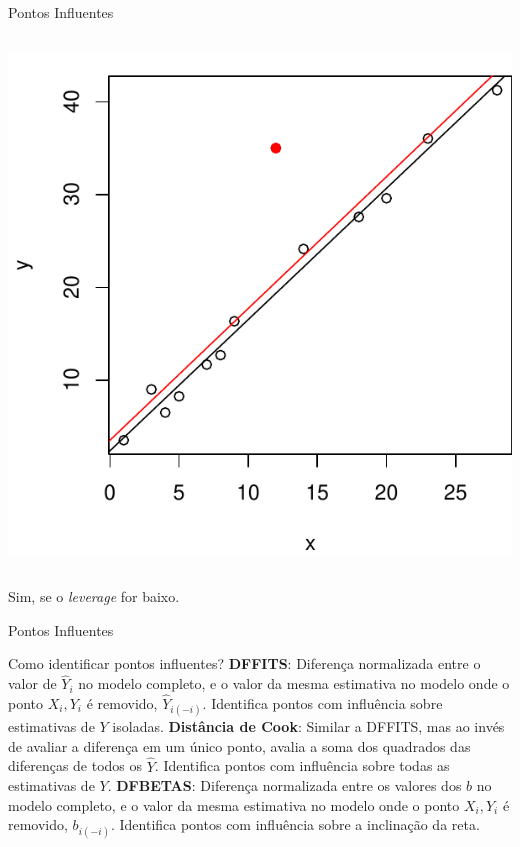 \documentclass{beamer}\usepackage[]{graphicx}\usepackage[]{color}
\newenvironment{knitrout}{}{} %
\renewenvironment{knitrout}{\setlength{\topsep}{0mm}}{}
\begin{document}
\begin{frame}{Pontos Influentes}
\begin{columns}[c]
\begin{knitrout}
\end{knitrout}
\pause
{}
\begin{knitrout}
\color{fgcolor}
\includegraphics[width=1\linewidth]{figure/d12-1} 

\end{knitrout}
\pause
\end{columns}
\vfill
Sim, se o \emph{leverage} for baixo.

\end{frame}

\begin{frame}{Pontos Influentes}
\small

Como identificar pontos influentes? \pause
\vfill
\textbf{DFFITS}: Diferença normalizada entre o valor de $\hat Y_i$ no modelo completo, e o valor da mesma estimativa no modelo onde o ponto $X_i,Y_i$ é removido, $\hat Y_{i(-i)}$. Identifica pontos com influência sobre estimativas de $Y$ isoladas. \pause
\vfill
\textbf{Distância de Cook}: Similar a DFFITS, mas ao invés de avaliar a diferença em um único ponto, avalia a soma dos quadrados das diferenças de todos os $\hat Y$. Identifica pontos com influência sobre todas as estimativas de $Y$. \pause
\vfill
\textbf{DFBETAS}: Diferença normalizada entre os valores dos $b$ no modelo completo, e o valor da mesma estimativa no modelo onde o ponto $X_i,Y_i$ é removido, $b_{i(-i)}$. Identifica pontos com influência sobre a inclinação da reta.

\end{frame}
\end{document}
